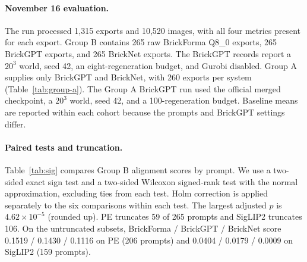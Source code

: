 \paragraph{November 16 evaluation.}
The run processed 1,315 exports and 10,520 images, with all four metrics present for each export. Group B contains 265 raw BrickForma Q8\_0 exports, 265 BrickGPT exports, and 265 BrickNet exports. The BrickGPT records report a $20^3$ world, seed 42, an eight-regeneration budget, and Gurobi disabled. Group A supplies only BrickGPT and BrickNet, with 260 exports per system (Table~\ref{tab:group-a}). The Group A BrickGPT run used the official merged checkpoint, a $20^3$ world, seed 42, and a 100-regeneration budget. Baseline means are reported within each cohort because the prompts and BrickGPT settings differ.


\paragraph{Paired tests and truncation.}
Table~\ref{tab:sig} compares Group B alignment scores by prompt. We use a two-sided exact sign test and a two-sided Wilcoxon signed-rank test with the normal approximation, excluding ties from each test. Holm correction is applied separately to the six comparisons within each test. The largest adjusted $p$ is $4.62{\times}10^{-5}$ (rounded up). PE truncates 59 of 265 prompts and SigLIP2 truncates 106. On the untruncated subsets, BrickForma / BrickGPT / BrickNet score 0.1519 / 0.1430 / 0.1116 on PE (206 prompts) and 0.0404 / 0.0179 / 0.0009 on SigLIP2 (159 prompts).



